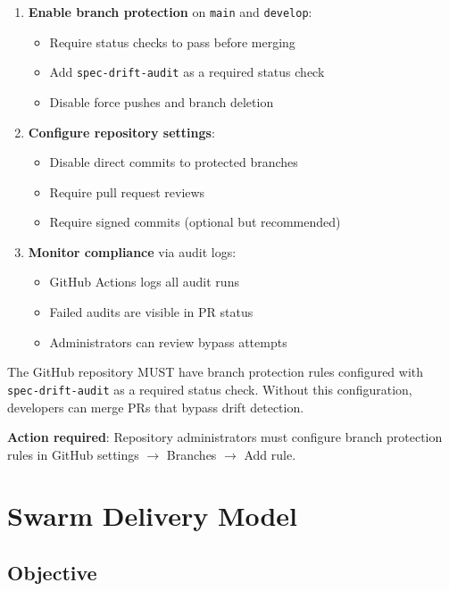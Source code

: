 \documentclass[11pt,a4paper,twoside]{report}
\begin{document}
\begin{enumerate}
\item \textbf{Enable branch protection} on \texttt{main} and \texttt{develop}:
\begin{itemize}
\item Require status checks to pass before merging
\item Add \texttt{spec-drift-audit} as a required status check
\item Disable force pushes and branch deletion
\end{itemize}

\item \textbf{Configure repository settings}:
\begin{itemize}
\item Disable direct commits to protected branches
\item Require pull request reviews
\item Require signed commits (optional but recommended)
\end{itemize}

\item \textbf{Monitor compliance} via audit logs:
\begin{itemize}
\item GitHub Actions logs all audit runs
\item Failed audits are visible in PR status
\item Administrators can review bypass attempts
\end{itemize}
\end{enumerate}

\begin{tcolorbox}[colback=yellow!5,colframe=yellow!70,title=\faIcon{exclamation-triangle} Enforcement Configuration Required]
The GitHub repository MUST have branch protection rules configured with
\texttt{spec-drift-audit} as a required status check. Without this
configuration, developers can merge PRs that bypass drift detection.

\textbf{Action required}: Repository administrators must configure branch
protection rules in GitHub settings $\rightarrow$ Branches $\rightarrow$ Add rule.
\end{tcolorbox}
\chapter{Swarm Delivery Model}
\label{ch:swarm}

\section{Objective}
\end{document}
